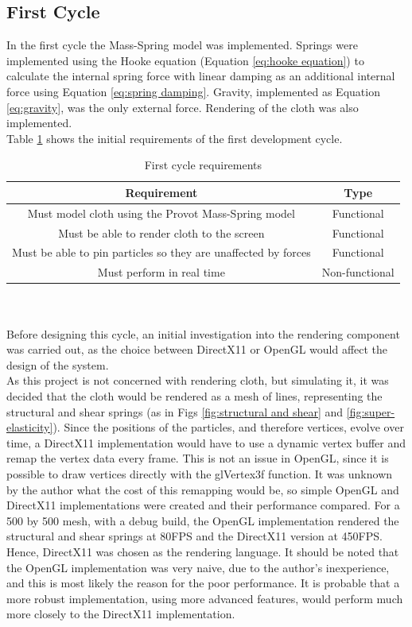\subsection{First Cycle}
In the first cycle the Mass-Spring model was implemented. Springs were implemented using the Hooke equation (Equation \ref{eq:hooke equation}) to calculate the internal spring force with linear damping as an additional internal force using Equation \ref{eq:spring damping}. Gravity, implemented as Equation \ref{eq:gravity}, was the only external force. Rendering of the cloth was also implemented.
\\Table \ref{tab:cycle 1 require} shows the initial requirements of the first development cycle.
\begin{table}[tp]
   \begin{minipage}{\textwidth}
      \begin{center}
         \begin{tabular}{c|c}
           Requirement & Type\\
           \hline
           Must model cloth using the Provot Mass-Spring model & Functional\\
           Must be able to render cloth to the screen & Functional\\
           Must be able to pin particles so they are unaffected by forces & Functional\\
           Must perform in real time& Non-functional\\
         \end{tabular}
      \end{center}
   \end{minipage}
   \caption{First cycle requirements}
   \label{tab:cycle 1 require}
\end{table}
\\\\Before designing this cycle, an initial investigation into the rendering component was carried out, as the choice between DirectX11 or OpenGL would affect the design of the system.
\\As this project is not concerned with rendering cloth, but simulating it, it was decided that the cloth would be rendered as a mesh of lines, representing the structural and shear springs (as in Figs \ref{fig:structural and shear} and \ref{fig:super-elasticity}). Since the positions of the particles, and therefore vertices, evolve over time, a DirectX11 implementation would have to use a dynamic vertex buffer and remap the vertex data every frame. This is not an issue in OpenGL, since it is possible to draw vertices directly with the glVertex3f function. It was unknown by the author what the cost of this remapping would be, so simple OpenGL and DirectX11 implementations were created and their performance compared. For a 500 by 500 mesh, with a debug build, the OpenGL implementation rendered the structural and shear springs at 80FPS and the DirectX11 version at 450FPS. Hence, DirectX11 was chosen as the rendering language. It should be noted that the OpenGL implementation was very naive, due to the author's inexperience, and this is most likely the reason for the poor performance. It is probable that a more robust implementation, using more advanced features, would perform much more closely to the DirectX11 implementation.
